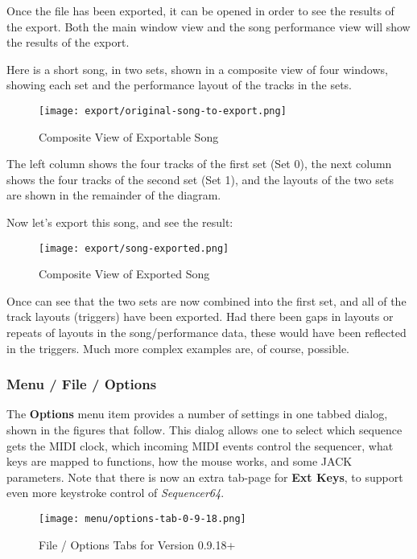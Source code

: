    Once the file has been exported, it can be opened in order to see
   the results of the export.  Both the main window view and the
   song performance view will show the results of the export.

   Here is a short song, in two sets, shown in a composite view of four windows,
   showing each set and the performance layout of the tracks in the sets.

\begin{figure}[H]
   \centering 
   \texttt{[image: export/original-song-to-export.png]}
   \caption{Composite View of Exportable Song}
   \label{fig:seq64_original_song_to_export}
\end{figure}

   The left column shows the four tracks of the first set (Set 0), the next
   column shows the four tracks of the second set (Set 1), and the
   layouts of the two sets are shown in the remainder of the diagram.

   Now let's export this song, and see the result:

\begin{figure}[H]
   \centering 
   \texttt{[image: export/song-exported.png]}
   \caption{Composite View of Exported Song}
   \label{fig:seq64_song_exported}
\end{figure}

   Once can see that the two sets are now combined into the first set,
   and all of the track layouts (triggers) have been exported.
   Had there been gaps in layouts or repeats of layouts in the song/performance
   data, these would have been reflected in the triggers.
   Much more complex examples are, of course, possible.

\subsubsection{Menu / File / Options}
\label{subsubsec:seq64_menu_file_options}

   The \textbf{Options} menu item provides a number of settings in one
   tabbed dialog, shown in the figures that follow.
   This dialog allows one to select which sequence gets the MIDI
   clock, which incoming MIDI events control the sequencer, what keys are
   mapped to functions, how the mouse works, and some JACK parameters.
   Note that there is now an extra tab-page for \textbf{Ext Keys}, to support
   even more keystroke control of \textsl{Sequencer64}.

\begin{figure}[H]
   \centering 
   \texttt{[image: menu/options-tab-0-9-18.png]}
   \caption{File / Options Tabs for Version 0.9.18+}
   \label{fig:seq64_options_tab_0_9_18}
\end{figure}

